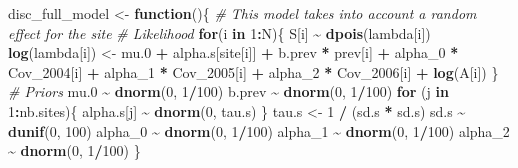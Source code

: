 \documentclass[
]{article}
\newenvironment{Shaded}{\begin{snugshade}}{\end{snugshade}}
\newcommand{\CommentTok}[1]{\textcolor[rgb]{0.56,0.35,0.01}{\textit{#1}}}
\newcommand{\ControlFlowTok}[1]{\textcolor[rgb]{0.13,0.29,0.53}{\textbf{#1}}}
\newcommand{\DecValTok}[1]{\textcolor[rgb]{0.00,0.00,0.81}{#1}}
\newcommand{\FloatTok}[1]{\textcolor[rgb]{0.00,0.00,0.81}{#1}}
\newcommand{\FunctionTok}[1]{\textcolor[rgb]{0.13,0.29,0.53}{\textbf{#1}}}
\newcommand{\NormalTok}[1]{#1}
\newcommand{\OtherTok}[1]{\textcolor[rgb]{0.56,0.35,0.01}{#1}}
\newcommand{\SpecialCharTok}[1]{\textcolor[rgb]{0.81,0.36,0.00}{\textbf{#1}}}
\begin{document}
\begin{Shaded}
\begin{Highlighting}[]
\NormalTok{disc\_full\_model }\OtherTok{\textless{}{-}} \ControlFlowTok{function}\NormalTok{()\{}
  \CommentTok{\# This model takes into account a random effect for the site}
  \CommentTok{\# Likelihood}
  \ControlFlowTok{for}\NormalTok{(i }\ControlFlowTok{in} \DecValTok{1}\SpecialCharTok{:}\NormalTok{N)\{}
\NormalTok{    S[i] }\SpecialCharTok{\textasciitilde{}} \FunctionTok{dpois}\NormalTok{(lambda[i])}
    \FunctionTok{log}\NormalTok{(lambda[i]) }\OtherTok{\textless{}{-}}\NormalTok{ mu}\FloatTok{.0} \SpecialCharTok{+}\NormalTok{ alpha.s[site[i]] }\SpecialCharTok{+}\NormalTok{ b.prev }\SpecialCharTok{*}\NormalTok{ prev[i] }\SpecialCharTok{+}\NormalTok{ alpha\_0 }\SpecialCharTok{*}\NormalTok{ Cov\_2004[i] }\SpecialCharTok{+}\NormalTok{ alpha\_1 }\SpecialCharTok{*}\NormalTok{ Cov\_2005[i] }\SpecialCharTok{+}\NormalTok{ alpha\_2 }\SpecialCharTok{*}\NormalTok{ Cov\_2006[i] }\SpecialCharTok{+} \FunctionTok{log}\NormalTok{(A[i])}
\NormalTok{  \}}
  \CommentTok{\# Priors}
\NormalTok{  mu}\FloatTok{.0} \SpecialCharTok{\textasciitilde{}} \FunctionTok{dnorm}\NormalTok{(}\DecValTok{0}\NormalTok{, }\DecValTok{1}\SpecialCharTok{/}\DecValTok{100}\NormalTok{)}
\NormalTok{  b.prev }\SpecialCharTok{\textasciitilde{}} \FunctionTok{dnorm}\NormalTok{(}\DecValTok{0}\NormalTok{, }\DecValTok{1}\SpecialCharTok{/}\DecValTok{100}\NormalTok{)}
  \ControlFlowTok{for}\NormalTok{ (j }\ControlFlowTok{in} \DecValTok{1}\SpecialCharTok{:}\NormalTok{nb.sites)\{}
\NormalTok{    alpha.s[j] }\SpecialCharTok{\textasciitilde{}} \FunctionTok{dnorm}\NormalTok{(}\DecValTok{0}\NormalTok{, tau.s)}
\NormalTok{  \}}
\NormalTok{  tau.s }\OtherTok{\textless{}{-}} \DecValTok{1} \SpecialCharTok{/}\NormalTok{ (sd.s }\SpecialCharTok{*}\NormalTok{ sd.s)}
\NormalTok{  sd.s }\SpecialCharTok{\textasciitilde{}} \FunctionTok{dunif}\NormalTok{(}\DecValTok{0}\NormalTok{, }\DecValTok{100}\NormalTok{)}
\NormalTok{  alpha\_0 }\SpecialCharTok{\textasciitilde{}} \FunctionTok{dnorm}\NormalTok{(}\DecValTok{0}\NormalTok{, }\DecValTok{1}\SpecialCharTok{/}\DecValTok{100}\NormalTok{)}
\NormalTok{  alpha\_1 }\SpecialCharTok{\textasciitilde{}} \FunctionTok{dnorm}\NormalTok{(}\DecValTok{0}\NormalTok{, }\DecValTok{1}\SpecialCharTok{/}\DecValTok{100}\NormalTok{)}
\NormalTok{  alpha\_2 }\SpecialCharTok{\textasciitilde{}} \FunctionTok{dnorm}\NormalTok{(}\DecValTok{0}\NormalTok{, }\DecValTok{1}\SpecialCharTok{/}\DecValTok{100}\NormalTok{)}
\NormalTok{\}}


\end{Highlighting}
\end{Shaded}
\end{document}
